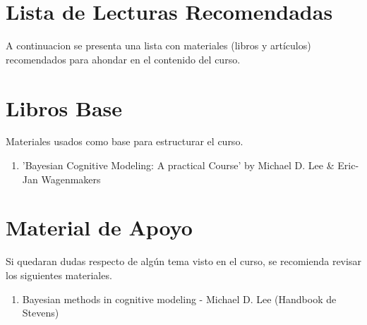 \documentclass[
10pt, %
a4paper, %
twocolumn, %
landscape %
]{article}
\begin{document}
\pagestyle{myheadings} %
\markright{\doctitle} %


\thispagestyle{plain} %

\printtitle %

\section*{Lista de Lecturas Recomendadas} %

A continuacion se presenta una lista con materiales (libros y artículos) recomendados para ahondar en el contenido del curso.

\section{Libros Base}

Materiales usados como base para estructurar el curso.

\begin{enumerate}

\item 'Bayesian Cognitive Modeling: A practical Course' by Michael D. Lee & Eric-Jan Wagenmakers
\end{enumerate}

\section{Material de Apoyo} %

Si quedaran dudas respecto de algún tema visto en el curso, se recomienda revisar los siguientes materiales.

\begin{enumerate}
\item Bayesian methods in cognitive modeling - Michael D. Lee (Handbook de Stevens)

\end{enumerate}
\end{document}
